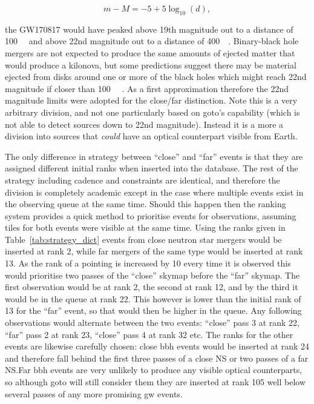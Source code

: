 \begin{colsection}
\begin{colsection}
\begin{equation}
    m-M = -5 +5\log_{10}(d),
    \label{eq:magnitude}
\end{equation}

the GW170817 would have peaked above 19th magnitude out to a distance of \SI{100}{\mega\parsec} and above 22nd magnitude out to a distance of \SI{400}{\mega\parsec}. Binary-black hole mergers are not expected to produce the same amounts of ejected matter that would produce a kilonova, but some predictions suggest there may be material ejected from disks around one or more of the black holes which might reach 22nd magnitude if closer than \SI{100}{\mega\parsec} \citep{BBH_EM, BBH_Gompertz}. As a first approximation therefore the 22nd magnitude limits were adopted for the close/far distinction. Note this is a very arbitrary division, and not one particularly based on \gls{goto}'s capability (which is not able to detect sources down to 22nd magnitude). Instead it is a more a division into sources that \textit{could} have an optical counterpart visible from Earth.

The only difference in strategy between ``close'' and ``far'' events is that they are assigned different initial ranks when inserted into the database. The rest of the strategy including cadence and constraints are identical, and therefore the division is completely academic except in the case where multiple events exist in the observing queue at the same time. Should this happen then the ranking system provides a quick method to prioritise events for observations, assuming tiles for both events were visible at the same time. Using the ranks given in Table~\ref{tab:strategy_dict} events from close neutron star mergers would be inserted at rank 2, while far mergers of the same type would be inserted at rank 13. As the rank of a pointing is increased by 10 every time it is observed this would prioritise two passes of the ``close'' skymap before the ``far'' skymap. The first observation would be at rank 2, the second at rank 12, and by the third it would be in the queue at rank 22. This however is lower than the initial rank of 13 for the ``far'' event, so that would then be higher in the queue. Any following observations would alternate between the two events: ``close'' pass 3 at rank 22, ``far'' pass 2 at rank 23, ``close'' pass 4 at rank 32 etc. The ranks for the other events are likewise carefully chosen: close \gls{bbh} events would be inserted at rank 24 and therefore fall behind the first three passes of a close NS or two passes of a far NS.\@ Far \gls{bbh} events are very unlikely to produce any visible optical counterparts, so although \gls{goto} will still consider them they are inserted at rank 105 well below several passes of any more promising \gls{gw} events.


\end{colsection}
\end{colsection}
